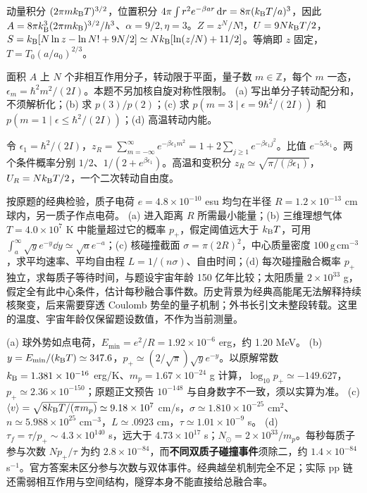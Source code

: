 \begin{solution}
动量积分 $(2\pi mk_{\mathrm B} T)^{3/2}$，位置积分 $4\pi\int r^2e^{-\beta ar}\,\mathrm d r=8\pi(k_{\mathrm B} T/a)^3$，因此 $A=8\pi k_{\mathrm B}^3(2\pi mk_{\mathrm B})^{3/2}/h^3$、$\alpha=9/2,\eta=3$。$Z=z^N/N!$，$U=9Nk_{\mathrm B} T/2$，$S=k_{\mathrm B}[N\ln z-\ln N!+9N/2]\simeq Nk_{\mathrm B}[\ln(z/N)+11/2]$。等熵即 $z$ 固定，$T=T_0(a/a_0)^{2/3}$。
\end{solution}
\begin{exercise}
面积 $A$ 上 $N$ 个非相互作用分子，转动限于平面，量子数 $m\in\mathbb Z$，每个 $m$ 一态，$\epsilon_m=\hbar^2m^2/(2I)$。本题不另加核自旋对称性限制。
(a) 写出单分子转动配分和，不须解析化；(b) 求 $p(3)/p(2)$；(c) 求 $p(m=3\mid\epsilon=9\hbar^2/(2I))$ 和 $p(m=1\mid\epsilon\le\hbar^2/(2I))$；(d) 高温转动内能。
\end{exercise}
\begin{solution}
令 $\epsilon_1=\hbar^2/(2I)$，$z_R=\sum_{m=-\infty}^{\infty}e^{-\beta\epsilon_1m^2}=1+2\sum_{j\ge1}e^{-\beta\epsilon_1j^2}$。比值 $e^{-5\beta\epsilon_1}$。两个条件概率分别 $1/2$、$1/(2+e^{\beta\epsilon_1})$。高温和变积分 $z_R\simeq\sqrt{\pi/(\beta\epsilon_1)}$，$U_R=Nk_{\mathrm B} T/2$，一个二次转动自由度。
\end{solution}
\begin{exercise}
按原题的经典检验，质子电荷 $e=4.8\times10^{-10}$ esu 均匀在半径 $R=1.2\times10^{-13}$ cm 球内，另一质子作点电荷。
(a) 进入距离 $R$ 所需最小能量；(b) 三维理想气体 $T=4.0\times10^7$ K 中能量超过它的概率 $p_+$，假定阈值远大于 $k_{\mathrm B} T$，可用 $\int_a^\infty\sqrt y e^{-y}\dd y\simeq\sqrt a e^{-a}$；(c) 核碰撞截面 $\sigma=\pi(2R)^2$，中心质量密度 $100\,\mathrm{g\,cm^{-3}}$，求平均速率、平均自由程 $L=1/(n\sigma)$、自由时间；(d) 每次碰撞融合概率 $p_+$ 独立，求每质子等待时间，与题设宇宙年龄 150 亿年比较；太阳质量 $2\times10^{33}$ g，假定全有此中心条件，估计每秒融合事件数。历史背景为经典高能尾无法解释持续核聚变，后来需要穿透 Coulomb 势垒的量子机制；外书长引文未整段转载。这里的温度、宇宙年龄仅保留题设数值，不作为当前测量。
\end{exercise}
\begin{solution}
(a) 球外势如点电荷，$E_{\min}=e^2/R=1.92\times10^{-6}$ erg，约 1.20 MeV。
(b) $y=E_{\min}/(k_{\mathrm B} T)\simeq347.6$，$p_+\simeq(2/\sqrt\pi)\sqrt y e^{-y}$。以原解常数 $k_{\mathrm B}=1.381\times10^{-16}$ erg/K、$m_p=1.67\times10^{-24}$ g 计算，$\log_{10}p_+\simeq-149.627$，$p_+\simeq2.36\times10^{-150}$；原题正文预告 $10^{-148}$ 与自身数字不一致，须以实算为准。
(c) $\langle v\rangle=\sqrt{8k_{\mathrm B} T/(\pi m_p)}\simeq9.18\times10^7$ cm/s，$\sigma\simeq1.810\times10^{-25}$ cm$^2$、$n\simeq5.988\times10^{25}$ cm$^{-3}$，$L\simeq.0923$ cm，$\tau\simeq1.01\times10^{-9}$ s。
(d) $\tau_f=\tau/p_+\sim4.3\times10^{140}$ s，远大于 $4.73\times10^{17}$ s；$N_\odot=2\times10^{33}/m_p$。每秒每质子参与次数 $Np_+/\tau$ 为约 $2.8\times10^{-84}$，而\textbf{不同双质子碰撞事件}须除二，约 $1.4\times10^{-84}$ s$^{-1}$。官方答案未区分参与次数与双体事件。经典越垒机制完全不足；实际 pp 链还需弱相互作用与空间结构，隧穿本身不能直接给总融合率。
\end{solution}
